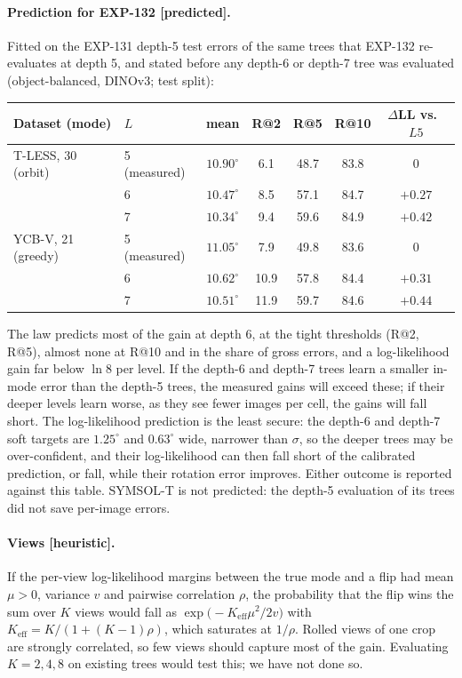 \paragraph{Prediction for EXP-132 [predicted].}
Fitted on the EXP-131 depth-5 test errors of the same trees that EXP-132 re-evaluates at depth 5, and stated before any depth-6 or
depth-7 tree was evaluated (object-balanced, DINOv3; test split):

\begin{center}\scriptsize\setlength{\tabcolsep}{3pt}
\begin{tabular}{@{}llccccc@{}}
\toprule
Dataset (mode) & $L$ & mean & R@2 & R@5 & R@10 & $\Delta$LL vs.\ $L5$\\
\midrule
T-LESS, 30 (orbit)  & 5 (measured) & $10.90^\circ$ & 6.1 & 48.7 & 83.8 & 0\\
                    & 6 & $10.47^\circ$ & 8.5 & 57.1 & 84.7 & $+0.27$\\
                    & 7 & $10.34^\circ$ & 9.4 & 59.6 & 84.9 & $+0.42$\\
\midrule
YCB-V, 21 (greedy)  & 5 (measured) & $11.05^\circ$ & 7.9 & 49.8 & 83.6 & 0\\
                    & 6 & $10.62^\circ$ & 10.9 & 57.8 & 84.4 & $+0.31$\\
                    & 7 & $10.51^\circ$ & 11.9 & 59.7 & 84.6 & $+0.44$\\
\bottomrule
\end{tabular}
\end{center}
The law predicts most of the gain at depth 6, at the tight thresholds (R@2, R@5), almost none at R@10 and in the share of gross
errors, and a log-likelihood gain far below $\ln8$ per level. If the depth-6 and depth-7 trees learn a smaller in-mode error than
the depth-5 trees, the measured gains will exceed these; if their deeper levels learn worse, as they see fewer images per
cell, the gains will fall short. The log-likelihood prediction is the least secure: the depth-6 and depth-7 soft targets are
$1.25^\circ$ and $0.63^\circ$ wide, narrower than $\sigma$, so the deeper trees may be over-confident, and their log-likelihood can
then fall short of the calibrated prediction, or fall, while their rotation error improves. Either outcome is reported against this table. SYMSOL-T is not predicted: the depth-5
evaluation of its trees did not save per-image errors.

\paragraph{Views [heuristic].}
If the per-view log-likelihood margins between the true mode and a flip had mean $\mu>0$, variance $v$ and pairwise correlation
$\rho$, the probability that the flip wins the sum over $K$ views would fall as $\exp\!\big(-K_{\mathrm{eff}}\mu^2/2v\big)$ with
$K_{\mathrm{eff}}=K/(1+(K-1)\rho)$, which saturates at $1/\rho$. Rolled views of one crop are strongly correlated, so few views
should capture most of the gain. Evaluating $K=2,4,8$ on existing trees would test this; we have not done so.

